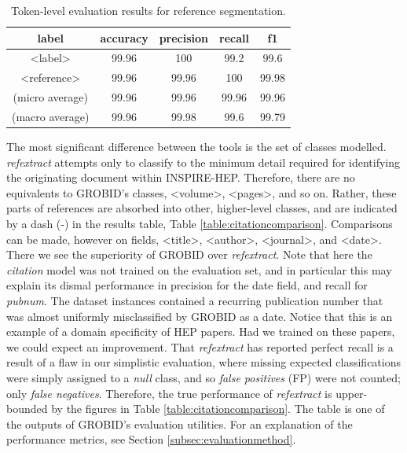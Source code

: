 \begin{table}[h]
\begin{center}
\begin{tabular}{|c|cccc|}
\hline
label           & accuracy  & precision  & recall   & f1 \\
\hline
<label>         & 99.96     & 100        & 99.2     & 99.6\\
<reference>     & 99.96     & 99.96      & 100      & 99.98\\
\hline
(micro average) & 99.96     & 99.96      & 99.96    & 99.96  \\
(macro average) & 99.96     & 99.98      & 99.6     & 99.79  \\
\hline
\end{tabular}
\caption[Token-level evaluation results for reference segmentation.]{Token-level evaluation results for reference segmentation.}
\label{table:referencesegmenterresults}
\end{center}
\end{table}

The most significant difference between the tools is the set of classes modelled. \emph{refextract} attempts only to classify to the minimum detail required for identifying the originating document within INSPIRE-HEP. Therefore, there are no equivalents to GROBID's classes, <volume>, <pages>, and so on. Rather, these parts of references are absorbed into other, higher-level classes, and are indicated by a dash (-) in the results table, Table \ref{table:citationcomparison}. Comparisons can be made, however on fields, <title>, <author>, <journal>, and <date>. There we see the superiority of GROBID over \emph{refextract}. Note that here the \emph{citation} model was not trained on the evaluation set, and in particular this may explain its dismal performance in precision for the date field, and recall for \emph{pubnum}. The dataset instances contained a recurring publication number that was almost uniformly misclassified by GROBID as a date. Notice that this is an example of a domain specificity of HEP papers. Had we trained on these papers, we could expect an improvement. That \emph{refextract} has reported perfect recall is a result of a flaw in our simplistic evaluation, where missing expected classifications were simply assigned to a \emph{null} class, and so \emph{false positives} (FP) were not counted; only \emph{false negatives}. Therefore, the true performance of \emph{refextract} is upper-bounded by the figures in Table \ref{table:citationcomparison}. The table is one of the outputs of GROBID's evaluation utilities. For an explanation of the performance metrics, see Section \ref{subsec:evaluationmethod}.


